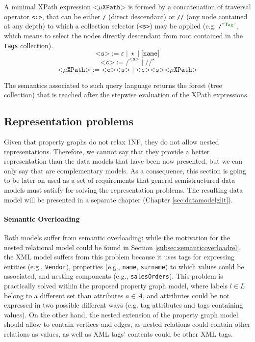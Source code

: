 \begin{definition}
	\label{def:minxpath}
	A minimal XPath expression $\texttt{<}\mu\texttt{XPath}\texttt{>}$ is formed by a concatenation of traversal operator \texttt{<c>}, that can be either \texttt{/} (direct descendant) or \texttt{//} (any node contained at any depth) to which a collection selector (\texttt{<s>}) may be applied (e.g. \texttt{/$^{\mstr{Tag}}$}, which means to select the nodes directly descendant from root contained in the \texttt{Tags} collection). 
	\[\texttt{<s>}:=\varepsilon\; |\; \star\;|\;\texttt{[name]}\]
	\[\texttt{<c>}:=\texttt{/}^\texttt{<s>}\;|\;\texttt{//}^\star\]
	\[\texttt{<}\mu\texttt{XPath}\texttt{>} :=\texttt{<c>}\texttt{<s>}\;|\;\texttt{<c>}\texttt{<s>}\texttt{<}\mu\texttt{XPath}\texttt{>}\]
\end{definition}

The semantics associated to such query language \cite{Wadler00} returns the forest (tree collection) that is reached after the stepwise evaluation of the XPath expressions.


\subsection{Representation problems}\label{sec:semireprproblems}
Given that property graphs do not relax 1NF, they do not allow nested representations. Therefore, we cannot say that they provide a better representation than the data models that have been now presented, but we can only say that are complementary models. As a consequence, this section is going to be later on used as a set of requirements that general semistructured data models must satisfy for solving the representation problems. The resulting data model will be presented in a separate chapter (Chapter \vref{sec:datamodelglit}).

\paragraph*{Semantic Overloading} Both models suffer from  semantic overloading: while the motivation for the nested relational model could be  found in Section \vref{subsec:semanticoverloadrel}, the XML model suffers from this problem because it uses tags for  expressing entities (e.g., \texttt{Vendor}), properties (e.g., \texttt{name}, \texttt{surname}) to which values could be associated, and nesting components (e.g., \texttt{salesOrders}). This problem is practically solved within the proposed property graph model, where labels $l\in L$ belong to a different set than attributes $a\in A$, and attributes could be not expressed in two possible different ways (e.g. tag attributes and tags containing values). On the other hand, the nested extension of the property graph model should allow to contain vertices and edges, as nested relations could contain other relations as values, as well as XML tags' contents could be other XML tags.

